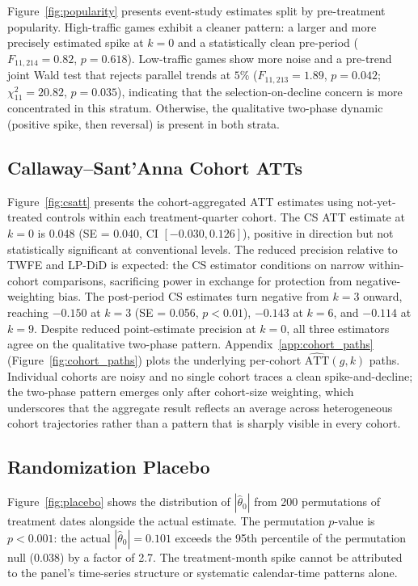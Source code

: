 \documentclass[11pt]{article}
\begin{document}
Figure~\ref{fig:popularity} presents event-study estimates split by pre-treatment
popularity. High-traffic games exhibit a cleaner pattern: a larger and more precisely
estimated spike at $k = 0$ and a statistically clean pre-period ($F_{11, 214} = 0.82$,
$p = 0.618$). Low-traffic games show more noise and a pre-trend joint Wald test that
rejects parallel trends at $5\%$ ($F_{11, 213} = 1.89$, $p = 0.042$;
$\chi^2_{11} = 20.82$, $p = 0.035$), indicating that the selection-on-decline concern
is more concentrated in this stratum. Otherwise, the qualitative two-phase dynamic (positive spike,
then reversal) is present in both strata.

\subsection{Callaway--Sant'Anna Cohort ATTs}

Figure~\ref{fig:csatt} presents the cohort-aggregated ATT estimates using not-yet-treated
controls within each treatment-quarter cohort.
The CS ATT estimate at $k = 0$ is 0.048 (SE = 0.040, CI $[-0.030, 0.126]$), positive
in direction but not statistically significant at conventional levels. The reduced
precision relative to TWFE and LP-DiD is expected: the CS estimator conditions on narrow
within-cohort comparisons, sacrificing power in exchange for protection from negative-weighting
bias. The post-period CS estimates turn negative from $k = 3$ onward, reaching $-0.150$
at $k = 3$ (SE = 0.056, $p < 0.01$), $-0.143$ at $k = 6$, and $-0.114$ at $k = 9$.
Despite reduced point-estimate precision at $k = 0$, all three estimators agree on the
qualitative two-phase pattern. Appendix~\ref{app:cohort_paths}
(Figure~\ref{fig:cohort_paths}) plots the underlying per-cohort
$\widehat{\text{ATT}}(g, k)$ paths. Individual cohorts are noisy and no single
cohort traces a clean spike-and-decline; the two-phase pattern emerges only
after cohort-size weighting, which underscores that the aggregate result
reflects an average across heterogeneous cohort trajectories rather than a
pattern that is sharply visible in every cohort.

\subsection{Randomization Placebo}

Figure~\ref{fig:placebo} shows the distribution of $|\hat{\theta}_0|$ from 200
permutations of treatment dates alongside the actual estimate.
The permutation $p$-value is $p < 0.001$: the actual $|\hat{\theta}_0| = 0.101$ exceeds
the 95th percentile of the permutation null (0.038) by a factor of 2.7. The treatment-month
spike cannot be attributed to the panel's time-series structure or systematic calendar-time
patterns alone.
\end{document}
